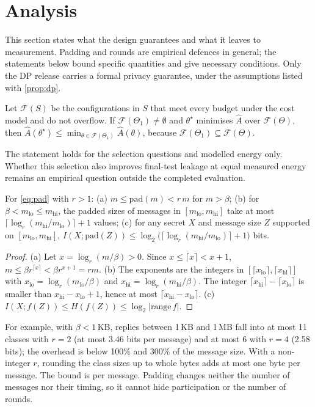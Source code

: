 \section{Analysis}\label{sec:analysis}

This section states what the design guarantees and what it leaves to measurement. Padding and rounds are empirical defences in general; the statements below bound specific quantities and give necessary conditions. Only the DP release carries a formal privacy guarantee, under the assumptions listed with \cref{prop:dp}.

\begin{remark}[Selection]\label{rem:dominance}
Let $\mathcal{F}(S)$ be the configurations in $S$ that meet every budget under the cost model and do not overflow. If $\mathcal{F}(\Theta_1)\neq\emptyset$ and $\theta^\star$ minimises $\hat A$ over $\mathcal{F}(\Theta)$, then $\hat A(\theta^\star)\le\min_{\theta\in\mathcal{F}(\Theta_1)}\hat A(\theta)$, because $\mathcal{F}(\Theta_1)\subseteq\mathcal{F}(\Theta)$.
\end{remark}
The statement holds for the selection questions and modelled energy only. Whether this selection also improves final-test leakage at equal measured energy remains an empirical question outside the completed evaluation.

\begin{proposition}\label{prop:pad}
For \cref{eq:pad} with $r>1$: (a) $m\le\mathrm{pad}(m)<r\,m$ for $m>\beta$; (b) for $\beta<m_{\mathrm{lo}}\le m_{\mathrm{hi}}$, the padded sizes of messages in $[m_{\mathrm{lo}},m_{\mathrm{hi}}]$ take at most $\lceil\log_r(m_{\mathrm{hi}}/m_{\mathrm{lo}})\rceil+1$ values; (c) for any secret $X$ and message size $Z$ supported on $[m_{\mathrm{lo}},m_{\mathrm{hi}}]$, $I(X;\mathrm{pad}(Z))\le\log_2\bigl(\lceil\log_r(m_{\mathrm{hi}}/m_{\mathrm{lo}})\rceil+1\bigr)$ bits.
\end{proposition}
\begin{proof}
(a) Let $x=\log_r(m/\beta)>0$. Since $x\le\lceil x\rceil<x+1$, $m\le\beta r^{\lceil x\rceil}<\beta r^{x+1}=rm$. (b) The exponents are the integers in $[\lceil x_{\mathrm{lo}}\rceil,\lceil x_{\mathrm{hi}}\rceil]$ with $x_{\mathrm{lo}}=\log_r(m_{\mathrm{lo}}/\beta)$ and $x_{\mathrm{hi}}=\log_r(m_{\mathrm{hi}}/\beta)$. The integer $\lceil x_{\mathrm{hi}}\rceil-\lceil x_{\mathrm{lo}}\rceil$ is smaller than $x_{\mathrm{hi}}-x_{\mathrm{lo}}+1$, hence at most $\lceil x_{\mathrm{hi}}-x_{\mathrm{lo}}\rceil$. (c) $I(X;f(Z))\le H(f(Z))\le\log_2|\mathrm{range}\,f|$.
\end{proof}
For example, with $\beta<1$\,KB, replies between 1\,KB and 1\,MB fall into at most 11 classes with $r=2$ (at most 3.46 bits per message) and at most 6 with $r=4$ (2.58 bits); the overhead is below 100\% and 300\% of the message size. With a non-integer $r$, rounding the class sizes up to whole bytes adds at most one byte per message. The bound is per message. Padding changes neither the number of messages nor their timing, so it cannot hide participation or the number of rounds.

